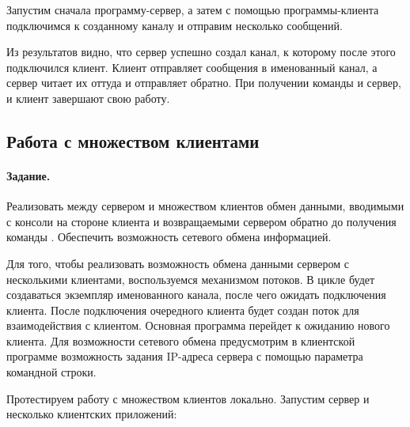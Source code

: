 \newpage

Запустим сначала программу-сервер, а затем с помощью программы-клиента подключимся к созданному каналу и отправим несколько сообщений.





Из результатов видно, что сервер успешно создал канал, к которому после этого подключился клиент. Клиент отправляет сообщения в именованный канал, а сервер читает их оттуда и отправляет обратно. При получении команды  и сервер, и клиент завершают свою работу.

\subsection{Работа с множеством клиентами}

\paragraph{Задание.} Реализовать между сервером и множеством клиентов обмен данными, вводимыми с консоли на стороне клиента и возвращаемыми сервером обратно до получения команды . Обеспечить возможность сетевого обмена информацией.

Для того, чтобы реализовать возможность обмена данными сервером с несколькими клиентами, воспользуемся механизмом потоков. В цикле будет создаваться экземпляр именованного канала, после чего ожидать подключения клиента. После подключения очередного клиента будет создан поток для взаимодействия с клиентом. Основная программа перейдет к ожиданию нового клиента. Для возможности сетевого обмена предусмотрим в клиентской программе возможность задания IP-адреса сервера с помощью параметра командной строки.





Протестируем работу с множеством клиентов локально. Запустим сервер и несколько клиентских приложений:






